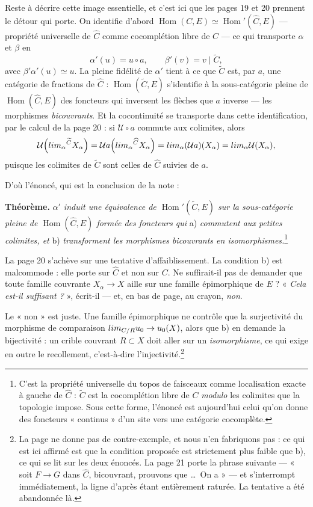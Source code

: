 \documentclass[11pt,a4paper]{article}
\begin{document}
Reste à décrire cette image essentielle, et c'est ici que les pages 19 et 20
prennent le détour qui porte. On identifie d'abord
$\operatorname{Hom}(C, E) \simeq \operatorname{Hom}'(\widehat{C}, E)$ —
propriété universelle de $\widehat{C}$ comme cocomplétion libre de $C$ — ce qui
transporte $\alpha$ et $\beta$ en
\[
\alpha'(u) = u \circ a, \qquad \beta'(v) = v \mid \widetilde{C},
\]
avec $\beta'\alpha'(u) \simeq u$. La pleine fidélité de $\alpha'$ tient à ce
que $\widetilde{C}$ est, par $a$, une catégorie de fractions de
$\widehat{C}$ : $\operatorname{Hom}(\widetilde{C}, E)$ s'identifie à la
sous-catégorie pleine de $\operatorname{Hom}(\widehat{C}, E)$ des foncteurs qui
inversent les flèches que $a$ inverse — les morphismes \emph{bicouvrants}. Et
la cocontinuité se transporte dans cette identification, par le calcul de la
page 20 : si $\mathcal{U} \circ a$ commute aux colimites, alors
\[
\mathcal{U}\Bigl(\varinjlim_{\alpha}{}^{\widetilde{C}} X_{\alpha}\Bigr)
= \mathcal{U}a\Bigl(\varinjlim_{\alpha}{}^{\widehat{C}} X_{\alpha}\Bigr)
= \varinjlim_{\alpha} (\mathcal{U}a)(X_{\alpha})
= \varinjlim_{\alpha} \mathcal{U}(X_{\alpha}),
\]
puisque les colimites de $\widetilde{C}$ sont celles de $\widehat{C}$ suivies
de $a$.

D'où l'énoncé, qui est la conclusion de la note :

\textbf{Théorème.} \emph{$\alpha'$ induit une équivalence de
$\operatorname{Hom}'(\widetilde{C}, E)$ sur la sous-catégorie pleine de
$\operatorname{Hom}(\widehat{C}, E)$ formée des foncteurs qui} a) \emph{commutent
aux petites colimites, et} b) \emph{transforment les morphismes bicouvrants en
isomorphismes.}\footnote{C'est la propriété universelle du topos de faisceaux
comme localisation exacte à gauche de $\widehat{C}$ : $\widetilde{C}$ est la
cocomplétion libre de $C$ \emph{modulo} les colimites que la topologie
impose. Sous cette forme, l'énoncé est aujourd'hui celui qu'on donne des
foncteurs « continus » d'un site vers une catégorie cocomplète.}

La page 20 s'achève sur une tentative d'affaiblissement. La condition b) est
malcommode : elle porte sur $\widehat{C}$ et non sur $C$. Ne suffirait-il pas
de demander que toute famille couvrante $X_{\alpha} \to X$ aille sur une
famille épimorphique de $E$ ? « \emph{Cela est-il suffisant ?} », écrit-il —
et, en bas de page, au crayon, \emph{non}.

Le « non » est juste. Une famille épimorphique ne contrôle que la surjectivité
du morphisme de comparaison $\varinjlim_{C/R} u_{0} \to u_{0}(X)$, alors que
b) en demande la bijectivité : un crible couvrant $R \subset X$ doit aller sur
un \emph{isomorphisme}, ce qui exige en outre le recollement, c'est-à-dire
l'injectivité.\footnote{La page ne donne pas de contre-exemple, et nous n'en
fabriquons pas : ce qui est ici affirmé est que la condition proposée est
strictement plus faible que b), ce qui se lit sur les deux énoncés. La page 21
porte la phrase suivante — « soit $F \to G$ dans $\widehat{C}$,
bicouvrant, prouvons que \ldots\ On a » — et s'interrompt immédiatement, la
ligne d'après étant entièrement raturée. La tentative a été abandonnée là.}
\end{document}
